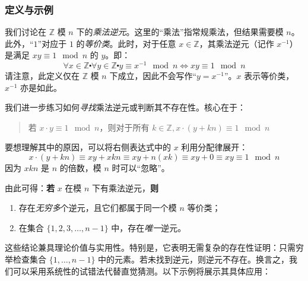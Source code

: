 \subsubsection*{定义与示例}

我们讨论在 $\mathbb{Z}$ 模 $n$ 下的\emph{乘法逆元}。这里的``乘法''指常规乘法，但结果需要模 $n$。此外，``$1$''对应于 $1$ 的\emph{等价类}。此时，对于任意 $x \in \mathbb{Z}$，其乘法逆元（记作 $x^{-1}$）是满足 $xy \equiv 1 \mod n$ 的 $y$。即：
\[\forall x \in \mathbb{Z} \centerdot \forall y \in \mathbb{Z} \centerdot y \equiv x^{-1} \mod n \iff xy \equiv 1 \mod n\]
请注意，此定义仅在 $\mathbb{Z}$ 模 $n$ 下成立，因此不会写作``$y = x^{-1}$''。$x$ 表示等价类，$x^{-1}$ 亦是如此。

我们进一步练习如何\emph{寻找}乘法逆元或判断其不存在性。核心在于：
\begin{quotation}
    若 $x \cdot y \equiv 1 \mod n$，则对于所有 $k \in \mathbb{Z}, x \cdot (y+kn) \equiv 1 \mod n$
\end{quotation}
要想理解其中的原因，可以将右侧表达式中的 $x$ 利用分配律展开：
\[x \cdot (y+kn) \equiv xy+xkn \equiv xy+n(xk) \equiv xy+0 \equiv xy \equiv 1 \mod n\]
因为 $xkn$ 是 $n$ 的倍数，模 $n$ 时可以``忽略''。

由此可得：\textbf{若} $x$ 在模 $n$ 下有乘法逆元，\textbf{则}
\begin{enumerate}[label=(\alph*)]
    \item 存在\emph{无穷多}个逆元，且它们都属于同一个模 $n$ 等价类；
    \item 在集合 $\{1, 2, 3, \dots , n-1\}$ 中，存在\emph{唯一}逆元。
\end{enumerate}

这些结论兼具理论价值与实用性。特别是，它表明无需复杂的存在性证明：只需穷举检查集合 $\{1, \dots, n-1\}$ 中的元素。若未找到逆元，则逆元不存在。换言之，我们可以采用系统性的试错法代替直觉猜测。以下示例将展示其具体应用：

